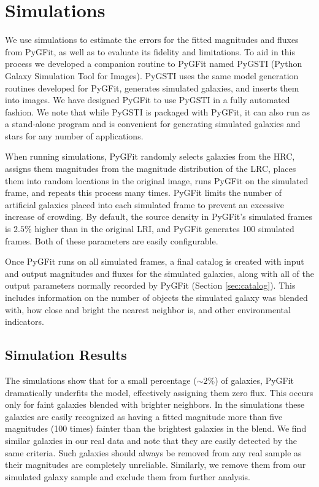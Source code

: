 \documentclass[preprint]{aastex}
\newcommand{\pygfit}{PyGFit}
\newcommand{\pygsti}{PyGSTI}
\begin{document}
\section{Simulations}\label{sec:sims}

We use simulations to estimate the errors for the fitted magnitudes and fluxes from \pygfit{}, as well as to evaluate its fidelity and limitations.  To aid in this process we developed a companion routine to \pygfit{} named \pygsti{} (Python Galaxy Simulation Tool for Images).  \pygsti{} uses the same model generation routines developed for \pygfit{}, generates simulated galaxies, and inserts them into images.  We have designed \pygfit{} to use \pygsti{} in a fully automated fashion.  We note that while \pygsti{} is packaged with \pygfit{}, it can also run as a stand-alone program and is convenient for generating simulated galaxies and stars for any number of applications.

When running simulations, \pygfit{} randomly selects galaxies from the HRC, assigns them magnitudes from the magnitude distribution of the LRC, places them into random locations in the original image, runs \pygfit{} on the simulated frame, and repeats this process many times.  \pygfit{} limits the number of artificial galaxies placed into each simulated frame to prevent an excessive increase of crowding.  By default, the source density in \pygfit{}'s simulated frames is $2.5\%$ higher than in the original LRI, and \pygfit{} generates 100 simulated frames.  Both of these parameters are easily configurable.

Once \pygfit{} runs on all simulated frames, a final catalog is created with input and output magnitudes and fluxes for the simulated galaxies, along with all of the output parameters normally recorded by \pygfit{} (Section \ref{sec:catalog}).  This includes information on the number of objects the simulated galaxy was blended with, how close and bright the nearest neighbor is, and other environmental indicators.

\subsection{Simulation Results}


The simulations show that for a small percentage ($\sim2\%$) of galaxies, \pygfit{} dramatically underfits the model, effectively assigning them zero flux.  This occurs only for faint galaxies blended with brighter neighbors. In the simulations these galaxies are easily recognized as having a fitted magnitude more than five magnitudes (100 times) fainter than the brightest galaxies in the blend. 
We find similar galaxies in our real data and note that they are easily detected by the same criteria.  Such galaxies should always be removed from any real sample as their magnitudes are completely unreliable.  Similarly, we remove them from our simulated galaxy sample and exclude them from further analysis.
\end{document}
